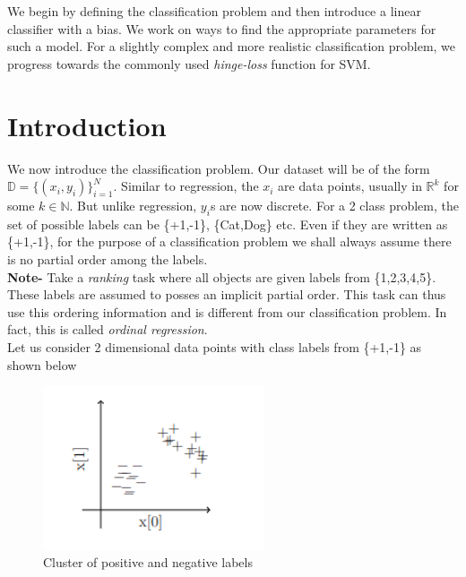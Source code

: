 \documentclass[12pt]{article}
\begin{document}
	\MakeScribeTop



We begin by defining the classification problem and then introduce a linear classifier with a bias. We work on ways to find the appropriate parameters for such a model. For a slightly complex and more realistic classification problem, we progress towards the commonly used \textit{hinge-loss} function for SVM.

\section{Introduction}
We now introduce the classification problem. Our dataset will be of the form $\mathbb{D}=\{(x_i,y_i)\}_{i=1}^N$. Similar to regression, the $x_i$ are data points, usually in $\mathbb{R}^k$ for some $k \in \mathbb{N}$. But unlike regression, $y_i$s are now discrete. For a 2 class problem, the set of possible labels can be \{+1,-1\}, \{Cat,Dog\} etc. Even if they are written as \{+1,-1\}, for the purpose of a classification problem we shall always assume there is no partial order among the labels.\\[2mm]
\textbf{Note-} Take a \textit{ranking} task where all objects are given labels from \{1,2,3,4,5\}. These labels are assumed to posses an implicit partial order. This task can thus use this ordering information and is different from our classification problem. In fact, this is called \textit{ordinal regression}.\\[2mm]
Let us consider 2 dimensional data points with class labels from \{+1,-1\} as shown below\\

 \begin{figure}[H]
    \centering
    \includegraphics[width=6.5cm]{clusters.png}
    \caption{Cluster of positive and negative labels}
\end{figure}
\end{document}
